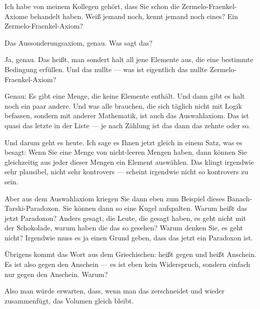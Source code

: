 \begin{spoken-clean}[00:03:50 - 00:06:50]
Ich habe von meinem Kollegen gehört, dass Sie schon die Zermelo-Fraenkel-Axiome behandelt haben. Weiß jemand noch, kennt jemand noch eines? Ein Zermelo-Fraenkel-Axiom?


Das Aussonderungsaxiom, genau. Was sagt das?


Ja, genau. Das heißt, man sondert halt all jene Elemente aus, die eine bestimmte Bedingung erfüllen. Und das nullte --- was ist eigentlich das nullte Zermelo-Fraenkel-Axiom?


Genau: Es gibt eine Menge, die keine Elemente enthält. Und dann gibt es halt noch ein paar andere. Und was alle brauchen, die sich täglich nicht mit Logik befassen, sondern mit anderer Mathematik, ist auch das Auswahlaxiom. Das ist quasi das letzte in der Liste --- je nach Zählung ist das dann das zehnte oder so.

Und darum geht es heute. Ich sage es Ihnen jetzt gleich in einem Satz, was es besagt: Wenn Sie eine Menge von nicht-leeren Mengen haben, dann können Sie gleichzeitig aus jeder dieser Mengen ein Element auswählen. Das klingt irgendwie sehr plausibel, nicht sehr kontrovers --- scheint irgendwie nicht so kontrovers zu sein.

Aber aus dem Auswahlaxiom kriegen Sie dann eben zum Beispiel dieses Banach-Tarski-Paradoxon. Sie können dann so eine Kugel aufspalten. Warum heißt das jetzt Paradoxon? Anders gesagt, die Leute, die gesagt haben, es geht nicht mit der Schokolade, warum haben die das so gesehen? Warum denken Sie, es geht nicht? Irgendwie muss es ja einen Grund geben, dass das jetzt ein Paradoxon ist.

Übrigens kommt das Wort aus dem Griechischen:  heißt gegen und  heißt Anschein. Es ist also gegen den Anschein --- es ist eben kein Widerspruch, sondern einfach nur gegen den Anschein. Warum?
\end{spoken-clean}

\begin{student-interaction}[Studentenantwort]
Also man würde erwarten, dass, wenn man das zerschneidet und wieder zusammenfügt, das Volumen gleich bleibt.
\end{student-interaction}

